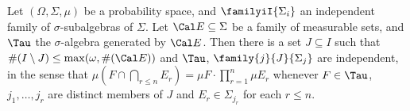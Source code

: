 Let $(\Omega,\Sigma,\mu)$ be a probability space,
and $\familyiI{\Sigma_i}$ an independent family of $\sigma$-subalgebras of
$\Sigma$.   Let $\Cal E\subseteq\Sigma$ be a family of measurable sets, and
$\Tau$ the $\sigma$-algebra generated by $\Cal E$.   Then there is a set
$J\subseteq I$ such that $\#(I\setminus J)\le\max(\omega,\#(\Cal E))$ and
$\Tau$, $\family{j}{J}{\Sigma_j}$ are independent, in the sense that
$\mu(F\cap\bigcap_{r\le n}E_r)=\mu F\cdot\prod_{r=1}^n\mu E_r$ whenever
$F\in\Tau$, $j_1,\ldots,j_r$ are distinct members of $J$ and
$E_r\in\Sigma_{j_r}$ for each $r\le n$.

